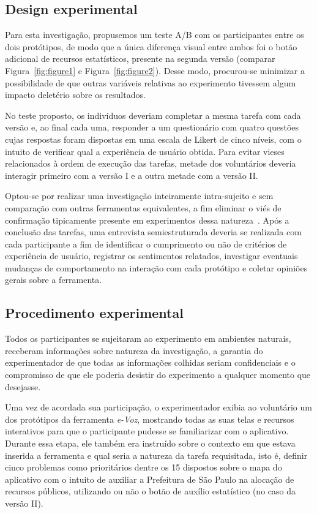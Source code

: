 \documentclass{sigchi}
\begin{document}
\subsection{Design experimental}
Para esta investigação, propusemos um teste A/B com os participantes entre os dois protótipos, de modo que a única diferença visual entre ambos foi o botão adicional de recursos estatísticos, presente na segunda versão (comparar Figura~\ref{fig:figure1} e Figura~\ref{fig:figure2}). Desse modo, procurou-se minimizar a possibilidade de que outras variáveis relativas ao experimento tivessem algum impacto deletério sobre os resultados.

No teste proposto, os indivíduos deveriam completar a mesma tarefa com cada versão e, ao final cada uma, responder a um questionário com quatro questões cujas respostas foram dispostas em uma escala de Likert de cinco níveis, com o intuito de verificar qual a experiência de usuário obtida. Para evitar vieses relacionados à ordem de execução das tarefas, metade dos voluntários deveria interagir primeiro com a versão I e a outra metade com a versão II.

Optou-se por realizar uma investigação inteiramente intra-sujeito e sem comparação com outras ferramentas equivalentes, a fim eliminar o viés de confirmação tipicamente presente em experimentos dessa natureza~\cite{dell:2012}. Após a conclusão das tarefas, uma entrevista semiestruturada deveria se realizada com cada participante a fim de identificar o cumprimento ou não de critérios de experiência de usuário, registrar os sentimentos relatados, investigar eventuais mudanças de comportamento na interação com cada protótipo e coletar opiniões gerais sobre a ferramenta.

\subsection{Procedimento experimental}
Todos os participantes se sujeitaram ao experimento em ambientes naturais, receberam informações sobre natureza da investigação, a garantia do experimentador de que todas as informações colhidas seriam confidenciais e o compromisso de que ele poderia desistir do experimento a qualquer momento que desejasse.

Uma vez de acordada sua participação, o experimentador exibia ao voluntário um dos protótipos da ferramenta \textit{e-Voz}, mostrando todas as suas telas e recursos interativos para que o participante pudesse se familiarizar com o aplicativo. Durante essa etapa, ele também era instruído sobre o contexto em que estava inserida a ferramenta e qual seria a natureza da tarefa requisitada, isto é, definir cinco problemas como prioritários dentre os 15 dispostos sobre o mapa do aplicativo com o intuito de auxiliar a Prefeitura de São Paulo na alocação de recursos públicos, utilizando ou não o botão de auxílio estatístico (no caso da versão II).
\end{document}
